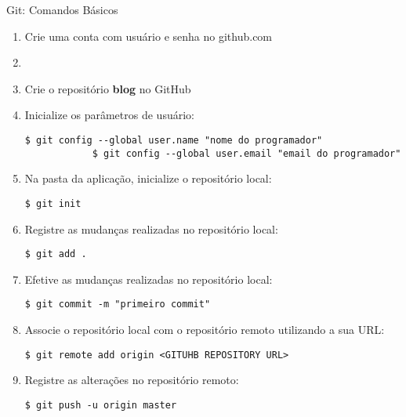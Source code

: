 \begin{frame}{Git: Comandos Básicos}
	\begin{enumerate}
		\item Crie uma conta com usuário e senha no github.com
		\item 
		\item Crie o repositório {\bf blog} no GitHub
		
		\item Inicialize os parâmetros de usuário: 
		\begin{lstlisting}[style=BashInputBasicStyle]
			$ git config --global user.name "nome do programador"
			$ git config --global user.email "email do programador"
		\end{lstlisting}
		
		\item Na pasta da aplicação, inicialize o repositório local:
		\begin{lstlisting}[style=BashInputBasicStyle]
			$ git init
		\end{lstlisting}
		
		\item Registre as mudanças realizadas no repositório local:
		\begin{lstlisting}[style=BashInputBasicStyle]
			$ git add .
		\end{lstlisting}

        \item Efetive as mudanças realizadas no repositório local:  		
        \begin{lstlisting}[style=BashInputBasicStyle]
			$ git commit -m "primeiro commit"
		\end{lstlisting}

		\item Associe o repositório local com o repositório remoto utilizando a sua URL:
		\begin{lstlisting}[style=BashInputBasicStyle]
			$ git remote add origin <GITUHB REPOSITORY URL>
		\end{lstlisting}

		\item Registre as alterações no repositório remoto:
		\begin{lstlisting}[style=BashInputBasicStyle]
			$ git push -u origin master
		\end{lstlisting}
	\end{enumerate}
\end{frame}